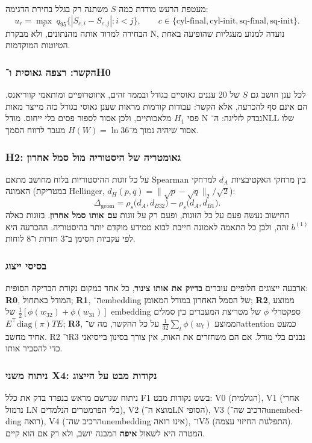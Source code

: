 \documentclass[12pt,a4paper]{article}
\newcommand{\en}[1]{\foreignlanguage{english}{#1}}   %
\newcommand{\bel}[1]{b^{(#1)}}
\newcommand{\dgeom}{\Delta_{\mathrm{geom}}}
\begin{document}
מעטפת הרעש מודדת כמה $S$ משתנה רק בגלל בחירת הדגימה:
\begin{equation}
u_r=\max_{c}\;q_{95}\big\{|S_{c,i}-S_{c,j}|:i<j\big\},\qquad c\in\{\text{cyl-final},\text{cyl-init},\text{sq-final},\text{sq-init}\}.
\end{equation}
הבחירה למדוד אותה מהנתונים, ולא מבקרת N, נועדה למנוע מעגליות שהופיעה באחת הטיוטות המוקדמות.

\subsubsection{הקשר: רצפה גאוסית ו־H0}
לכל ענן חושב גם $S$ של 20 עננים גאוסיים בגודל ובממד זהים, איזוטרופיים ומותאמי קווריאנס. הם אינם סף להכרעה, אלא הקשר: עבודות קודמות מראות שענן גאוסי בגודל כזה מייצר מאות פסי $H_1$ מלאכותיים, ולכן אסור לספור פסים בלי ייחוס. מודל N נבדק לזליגה: ה־\en{NLL} שלו אסור שיהיה נמוך מ־$H(W)=\ln 36$ מעבר לרווח הסמך.

\subsubsection{H2: גאומטריה של היסטוריה מול סמל אחרון}
על כל זוגות ההיסטוריות בלוח מחושב מתאם \en{Spearman} בין מרחקי האקטיבציות $d_A$ למרחקי האמונה (במטריקת \en{Hellinger}, $d_H(p,q)=\|\sqrt p-\sqrt q\|_2/\sqrt2$):
\begin{equation}
\dgeom=\rho_s\big(d_A,d_{B32}\big)-\rho_s\big(d_A,d_{B1}\big).
\end{equation}
החישוב נעשה פעם על כל הזוגות, ופעם רק על זוגות \textbf{עם אותו סמל אחרון}. בזוגות כאלה $\bel{1}$ זהה, ולכן כל התאמה לאמונה חייבת לבוא ממידע מוקדם יותר בהיסטוריה. ההכרעה היא לפי עקביות הסימן ב־3 חזרות ו־8 לוחות.

\subsubsection{בסיסי ייצוג}
ארבעה ייצוגים חלופיים עוברים \textbf{בדיוק את אותו צינור}, כל אחד במקום נקודת הבדיקה הסופית: \textbf{R0}, המודל באתחול; \textbf{R1}, ה־\en{embedding} של הסמל האחרון במודל המאומן; \textbf{R2}, ממוצע $\tfrac12[\phi(w_{32})+\phi(w_{31})]$ של \en{embedding} ספקטרלי $\phi$ של מטריצת המעברים בין סמלים $E^{\top}\mathrm{diag}(\pi)TE$; \textbf{R3}, הממוצע $\tfrac1{32}\sum_t\phi(w_t)$ על כל ההקשר, מה ש־\en{attention} כמעט אחיד מחשב. R2 ו־R3 נבנים בלי מודל. אם הם משחזרים את האות, אין צורך בסינון בייסיאני כדי להסביר אותו.

\subsubsection{ניתוח משני \en{X4}: נקודות מבט על הייצוג}
ניתוח שנרשם מראש בנפרד בדק את כלל F1 בשש נקודות מבט: V0 (הגולמית), V1 (אחרי נרמול \en{LN} בלי הפרמטרים הנלמדים), V2 (מוצא ה־\en{LN} הסופי), V3 (הרכיב שה־\en{unembedding} רואה), V4 (הרכיב שה־\en{unembedding} אינו רואה), ו־V5 (התפלגות החיזוי עצמה). המטרה היא לשאול \textbf{איפה} המבנה יושב, ולא רק אם הוא קיים.
\end{document}
